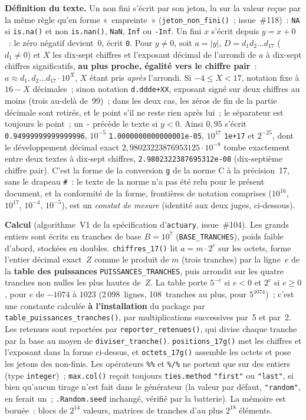 \documentclass[a4paper,11pt]{article}
\newcommand{\code}[1]{\texttt{\small #1}}
\begin{document}
\medskip
\noindent
\textbf{Définition du texte.} Un non fini s'écrit par son jeton, lu sur la
valeur reçue par la même règle qu'en forme «~empreinte~»
(\code{jeton\_non\_fini()}~; issue~\#118)~: \code{NA} si \code{is.na()} et
non \code{is.nan()}, \code{NaN}, \code{Inf} ou \code{-Inf}. Un fini $x$
s'écrit depuis $y = x + 0$~: le zéro négatif devient~0, écrit \code{0}. Pour
$y \neq 0$, soit $a = |y|$, $D = d_1 d_2 \ldots d_{17}$ ($d_1 \neq 0$) et $X$
les dix-sept chiffres et l'exposant décimal de l'arrondi de $a$ à dix-sept
chiffres significatifs, \textbf{au plus proche, égalité vers le chiffre
pair}~: $a \approx d_1{,}d_2 \ldots d_{17} \cdot 10^{X}$, $X$ étant pris
\emph{après} l'arrondi. Si $-4 \le X < 17$, notation fixe à $16 - X$
décimales~; sinon notation \code{d.ddde+XX}, exposant signé sur deux
chiffres au moins (trois au-delà de~99)~; dans les deux cas, les zéros de fin
de la partie décimale sont retirés, et le point s'il ne reste rien après
lui~; le séparateur est toujours le point~; un \code{-} précède le texte si
$y < 0$. Ainsi $0{,}95$ s'écrit \code{0.94999999999999996}, $10^{-5}$
\code{1.0000000000000001e-05}, $10^{17}$ \code{1e+17} et $2^{-25}$, dont le
développement décimal exact $2{,}98023223876953125 \cdot 10^{-8}$ tombe
exactement entre deux textes à dix-sept chiffres, \code{2.9802322387695312e-08}
(dix-septième chiffre pair). C'est la forme de la conversion \code{g} de la
norme C à la précision~17, sans le drapeau \code{\#}~: le texte de la norme
n'a pas été relu pour le présent document, et la conformité de la forme,
frontières de notation comprises ($10^{16}$, $10^{17}$, $10^{-4}$,
$10^{-5}$), est un \emph{constat de mesure} (identité aux deux juges,
ci-dessous).

\medskip
\noindent
\textbf{Calcul} (algorithme~V1 de la spécification d'\code{actuary}, issue~\#104).
Les grands entiers sont écrits en tranches de base $B = 10^{7}$
(\code{BASE\_TRANCHES}), poids faible d'abord, stockées en doubles.
\code{chiffres\_17()} lit $a = m \cdot 2^{e}$ sur les octets, forme l'entier
décimal exact~$Z$ comme le produit de $m$ (trois tranches) par la ligne~$e$
de la \textbf{table des puissances} \code{PUISSANCES\_TRANCHES}, puis
arrondit sur les quatre tranches non nulles les plus hautes de~$Z$. La
table porte $5^{-e}$ si $e < 0$ et $2^{e}$ si $e \ge 0$, pour $e$ de $-1074$
à $1023$ (2\,098~lignes, 108~tranches au plus, pour $5^{1074}$)~; c'est une
constante calculée \textbf{à l'installation} du package par
\code{table\_puissances\_tranches()}, par multiplications successives par~5
et par~2. Les retenues sont reportées par \code{reporter\_retenues()}, qui
divise chaque tranche par la base au moyen de \code{diviser\_tranche()}.
\code{positions\_17g()} met les chiffres et l'exposant dans la forme
ci-dessus, et \code{octets\_17g()} assemble les octets et pose les jetons des
non-finis. Les opérateurs \code{\%\%} et \code{\%/\%} ne portent que sur des
entiers (type \code{integer})~; \code{max.col()} reçoit toujours
\code{ties.method} \code{"first"} ou \code{"last"}, si bien qu'aucun tirage
n'est fait dans le générateur (la valeur par défaut, \code{"random"}, en
ferait un~; \code{.Random.seed} inchangé, vérifié par la batterie). La
mémoire est bornée~: blocs de $2^{14}$ valeurs, matrices de tranches d'au
plus $2^{18}$ éléments.
\end{document}
